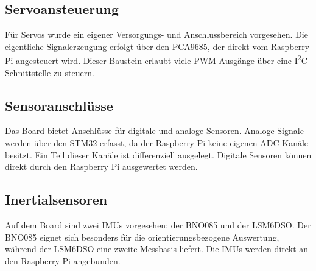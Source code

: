 \subsection{Servoansteuerung}
Für Servos wurde ein eigener Versorgungs- und Anschlussbereich vorgesehen. Die eigentliche Signalerzeugung erfolgt über den PCA9685, der direkt vom Raspberry Pi angesteuert wird. Dieser Baustein erlaubt viele PWM-Ausgänge über eine I\textsuperscript{2}C-Schnittstelle zu steuern.

\subsection{Sensoranschlüsse}
Das Board bietet Anschlüsse für digitale und analoge Sensoren. Analoge Signale werden über den STM32 erfasst, da der Raspberry Pi keine eigenen ADC-Kanäle besitzt. Ein Teil dieser Kanäle ist differenziell ausgelegt. Digitale Sensoren können direkt durch den Raspberry Pi ausgewertet werden.

\subsection{Inertialsensoren}
Auf dem Board sind zwei IMUs vorgesehen: der BNO085 und der LSM6DSO.  Der BNO085 eignet sich besonders für die orientierungsbezogene Auswertung, während der LSM6DSO eine zweite Messbasis liefert. Die IMUs werden direkt an den Raspberry Pi angebunden.

